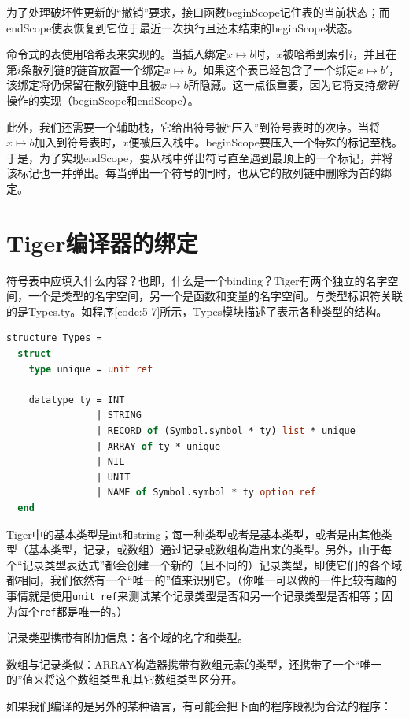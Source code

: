 \documentclass[cn,11pt,chinese]{elegantbook}
\begin{document}
为了处理破坏性更新的“撤销”要求，接口函数beginScope记住表的当前状态；而endScope使表恢复到它位于最近一次执行且还未结束的beginScope状态。

命令式的表使用哈希表来实现的。当插入绑定$x\mapsto b$时，$x$被哈希到索引$i$，并且在第$i$条散列链的链首放置一个绑定$x\mapsto b$。如果这个表已经包含了一个绑定$x\mapsto b'$，该绑定将仍保留在散列链中且被$x\mapsto b$所隐藏。这一点很重要，因为它将支持\textit{撤销}操作的实现（beginScope和endScope）。

此外，我们还需要一个辅助栈，它给出符号被“压入”到符号表时的次序。当将$x\mapsto b$加入到符号表时，$x$便被压入栈中。beginScope要压入一个特殊的标记至栈。于是，为了实现endScope，要从栈中弹出符号直至遇到最顶上的一个标记，并将该标记也一并弹出。每当弹出一个符号的同时，也从它的散列链中删除为首的绑定。

\section{Tiger编译器的绑定}

符号表中应填入什么内容？也即，什么是一个binding？Tiger有两个独立的名字空间，一个是类型的名字空间，另一个是函数和变量的名字空间。与类型标识符关联的是Types.ty。如程序\ref{code:5-7}所示，Types模块描述了表示各种类型的结构。

\begin{lstlisting}[language=ml,caption={Types结构},label={code:5-7}]
  structure Types =
  struct
    type unique = unit ref

    datatype ty = INT
                | STRING
                | RECORD of (Symbol.symbol * ty) list * unique
                | ARRAY of ty * unique
                | NIL
                | UNIT
                | NAME of Symbol.symbol * ty option ref
  end
\end{lstlisting}

Tiger中的基本类型是int和string；每一种类型或者是基本类型，或者是由其他类型（基本类型，记录，或数组）通过记录或数组构造出来的类型。另外，由于每个“记录类型表达式”都会创建一个新的（且不同的）记录类型，即使它们的各个域都相同，我们依然有一个“唯一的”值来识别它。（你唯一可以做的一件比较有趣的事情就是使用\lstinline{unit ref}来测试某个记录类型是否和另一个记录类型是否相等；因为每个\lstinline{ref}都是唯一的。）

记录类型携带有附加信息：各个域的名字和类型。

数组与记录类似：ARRAY构造器携带有数组元素的类型，还携带了一个“唯一的”值来将这个数组类型和其它数组类型区分开。

如果我们编译的是另外的某种语言，有可能会把下面的程序段视为合法的程序：
\end{document}
